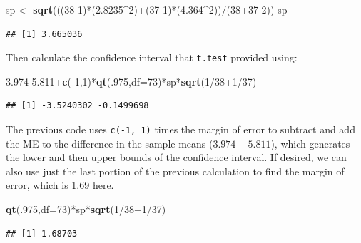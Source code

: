 \documentclass[]{book}
\newenvironment{Shaded}{\begin{snugshade}}{\end{snugshade}}
\newcommand{\KeywordTok}[1]{\textcolor[rgb]{0.13,0.29,0.53}{\textbf{{#1}}}}
\newcommand{\DataTypeTok}[1]{\textcolor[rgb]{0.13,0.29,0.53}{{#1}}}
\newcommand{\DecValTok}[1]{\textcolor[rgb]{0.00,0.00,0.81}{{#1}}}
\newcommand{\FloatTok}[1]{\textcolor[rgb]{0.00,0.00,0.81}{{#1}}}
\newcommand{\StringTok}[1]{\textcolor[rgb]{0.31,0.60,0.02}{{#1}}}
\newcommand{\NormalTok}[1]{{#1}}
\begin{document}
\begin{Shaded}
\begin{Highlighting}[]
\NormalTok{sp <-}\StringTok{ }\KeywordTok{sqrt}\NormalTok{(((}\DecValTok{38-1}\NormalTok{)*(}\FloatTok{2.8235}\NormalTok{^}\DecValTok{2}\NormalTok{)+(}\DecValTok{37-1}\NormalTok{)*(}\FloatTok{4.364}\NormalTok{^}\DecValTok{2}\NormalTok{))/(}\DecValTok{38+37-2}\NormalTok{))}
\NormalTok{sp}
\end{Highlighting}
\end{Shaded}

\begin{verbatim}
## [1] 3.665036
\end{verbatim}

Then calculate the confidence interval that \texttt{t.test} provided
using:

\begin{Shaded}
\begin{Highlighting}[]
\FloatTok{3.974-5.811}\NormalTok{+}\KeywordTok{c}\NormalTok{(-}\DecValTok{1}\NormalTok{,}\DecValTok{1}\NormalTok{)*}\KeywordTok{qt}\NormalTok{(.}\DecValTok{975}\NormalTok{,}\DataTypeTok{df=}\DecValTok{73}\NormalTok{)*sp*}\KeywordTok{sqrt}\NormalTok{(}\DecValTok{1}\NormalTok{/}\DecValTok{38+1}\NormalTok{/}\DecValTok{37}\NormalTok{)}
\end{Highlighting}
\end{Shaded}

\begin{verbatim}
## [1] -3.5240302 -0.1499698
\end{verbatim}

The previous code uses \texttt{c(-1,\ 1)} times the margin of error to
subtract and add the ME to the difference in the sample means
(\(3.974-5.811\)), which generates the lower and then upper bounds of
the confidence interval. If desired, we can also use just the last
portion of the previous calculation to find the margin of error, which
is 1.69 here.

\begin{Shaded}
\begin{Highlighting}[]
\KeywordTok{qt}\NormalTok{(.}\DecValTok{975}\NormalTok{,}\DataTypeTok{df=}\DecValTok{73}\NormalTok{)*sp*}\KeywordTok{sqrt}\NormalTok{(}\DecValTok{1}\NormalTok{/}\DecValTok{38+1}\NormalTok{/}\DecValTok{37}\NormalTok{)}
\end{Highlighting}
\end{Shaded}

\begin{verbatim}
## [1] 1.68703
\end{verbatim}
\end{document}
